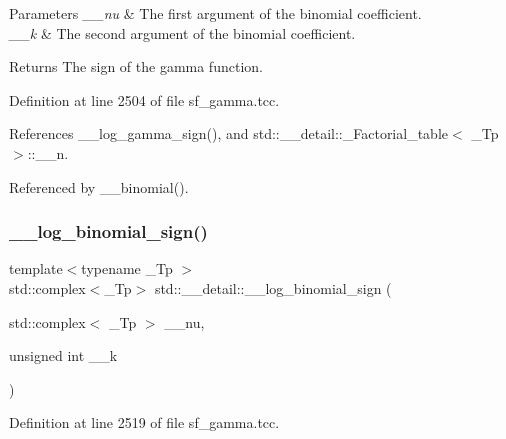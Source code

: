 \begin{DoxyParams}{Parameters}
{\em \+\_\+\+\_\+nu} & The first argument of the binomial coefficient. \\
\hline
{\em \+\_\+\+\_\+k} & The second argument of the binomial coefficient. \\
\hline
\end{DoxyParams}
\begin{DoxyReturn}{Returns}
The sign of the gamma function. 
\end{DoxyReturn}


Definition at line 2504 of file sf\+\_\+gamma.\+tcc.



References \+\_\+\+\_\+log\+\_\+gamma\+\_\+sign(), and std\+::\+\_\+\+\_\+detail\+::\+\_\+\+Factorial\+\_\+table$<$ \+\_\+\+Tp $>$\+::\+\_\+\+\_\+n.



Referenced by \+\_\+\+\_\+binomial().

\mbox{\label{namespacestd_1_1____detail_ad73e7e0dfab6a4f54af026fa3d9e9c9a}} 
\subsubsection{\texorpdfstring{\+\_\+\+\_\+log\+\_\+binomial\+\_\+sign()}{\_\_log\_binomial\_sign()}\hspace{0.1cm}{\footnotesize\ttfamily [2/2]}}
{\footnotesize\ttfamily template$<$typename \+\_\+\+Tp $>$ \\
std\+::complex$<$\+\_\+\+Tp$>$ std\+::\+\_\+\+\_\+detail\+::\+\_\+\+\_\+log\+\_\+binomial\+\_\+sign (\begin{DoxyParamCaption}\item[{std\+::complex$<$ \+\_\+\+Tp $>$}]{\+\_\+\+\_\+nu,  }\item[{unsigned int}]{\+\_\+\+\_\+k }\end{DoxyParamCaption})}



Definition at line 2519 of file sf\+\_\+gamma.\+tcc.

\mbox{\label{namespacestd_1_1____detail_ad7606a8224ac0c2256996b91051a48a5}} 
